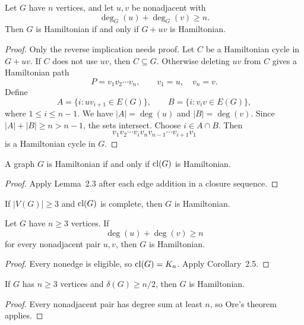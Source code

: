 \begin{notelemma}
Let $G$ have $n$ vertices, and let $u,v$ be nonadjacent with
\[
  \deg_G(u)+\deg_G(v)\ge n.
\]
Then $G$ is Hamiltonian if and only if $G+uv$ is Hamiltonian.
\end{notelemma}
\begin{proof}
Only the reverse implication needs proof.  Let $C$ be a Hamiltonian cycle in $G+uv$.  If $C$ does not use $uv$, then $C\subseteq G$.  Otherwise deleting $uv$ from $C$ gives a Hamiltonian path
\[
  P=v_1v_2\cdots v_n,
  \qquad v_1=u,
  \quad v_n=v.
\]
Define
\[
  A=\{i:uv_{i+1}\in E(G)\},
  \qquad
  B=\{i:v_iv\in E(G)\},
\]
where $1\le i\le n-1$.  We have $|A|=\deg(u)$ and $|B|=\deg(v)$.  Since $|A|+|B|\ge n>n-1$, the sets intersect.  Choose $i\in A\cap B$.  Then
\[
  v_1v_2\cdots v_i v_n v_{n-1}\cdots v_{i+1}v_1
\]
is a Hamiltonian cycle in $G$.
\end{proof}
\begin{notetheorem}
A graph $G$ is Hamiltonian if and only if $\operatorname{cl}(G)$ is Hamiltonian.
\end{notetheorem}
\begin{proof}
Apply Lemma~2.3 after each edge addition in a closure sequence.
\end{proof}

\begin{notecorollary}
If $|V(G)|\ge3$ and $\operatorname{cl}(G)$ is complete, then $G$ is Hamiltonian.
\end{notecorollary}

\begin{notetheorem}
Let $G$ have $n\ge3$ vertices.  If
\[
  \deg(u)+\deg(v)\ge n
\]
for every nonadjacent pair $u,v$, then $G$ is Hamiltonian.
\end{notetheorem}
\begin{proof}
Every nonedge is eligible, so $\operatorname{cl}(G)=K_n$.  Apply Corollary~2.5.
\end{proof}

\begin{notetheorem}
If $G$ has $n\ge3$ vertices and $\delta(G)\ge n/2$, then $G$ is Hamiltonian.
\end{notetheorem}
\begin{proof}
Every nonadjacent pair has degree sum at least $n$, so Ore's theorem applies.
\end{proof}

